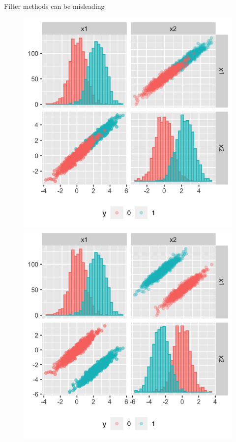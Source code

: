 \documentclass[11pt,compress,t,notes=noshow, xcolor=table]{beamer}
\begin{document}
\begin{vbframe}{Filter methods can be misleading}
     \begin{figure}
    \centering
    \begin{minipage}{0.45\textwidth}
        \centering
        \includegraphics[width=\textwidth]{figure/guyon_example_intra_class_covariance.png} %
    \end{minipage}\hfill
    \begin{minipage}{0.45\textwidth}
        \centering
        \includegraphics[width=\textwidth]{figure/guyon_example_intra_class_covariance_perpendicular.png} %

\end{minipage}
\end{figure}
\end{vbframe}
\end{document}
